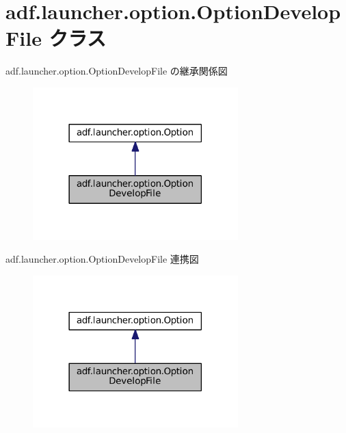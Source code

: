 \hypertarget{classadf_1_1launcher_1_1option_1_1OptionDevelopFile}{}\section{adf.\+launcher.\+option.\+Option\+Develop\+File クラス}
\label{classadf_1_1launcher_1_1option_1_1OptionDevelopFile}


adf.\+launcher.\+option.\+Option\+Develop\+File の継承関係図
\nopagebreak
\begin{figure}[H]
\begin{center}
\leavevmode
\includegraphics[width=225pt]{classadf_1_1launcher_1_1option_1_1OptionDevelopFile__inherit__graph}
\end{center}
\end{figure}


adf.\+launcher.\+option.\+Option\+Develop\+File 連携図
\nopagebreak
\begin{figure}[H]
\begin{center}
\leavevmode
\includegraphics[width=225pt]{classadf_1_1launcher_1_1option_1_1OptionDevelopFile__coll__graph}
\end{center}
\end{figure}
